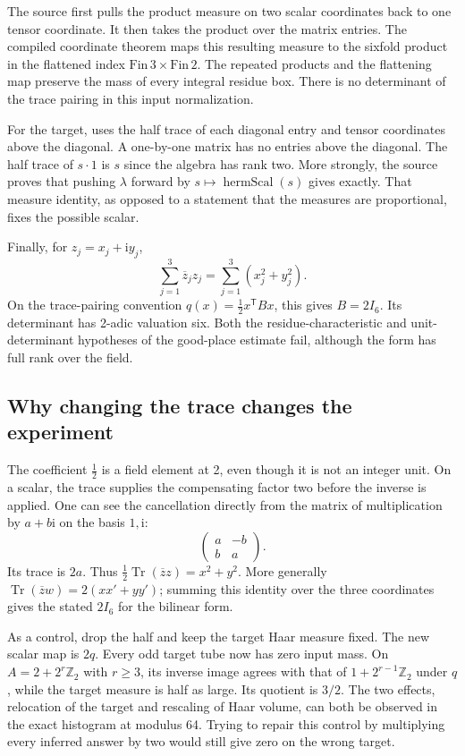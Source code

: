 \documentclass[12pt,letterpaper]{article}
\newcommand{\code}[1]{\texttt{\detokenize{#1}}}
\begin{document}
The source first pulls the product measure on two scalar coordinates back to one tensor coordinate. It then takes the product over the matrix entries. The compiled coordinate theorem maps this resulting measure to the sixfold product in the flattened index \( \mathrm{Fin}\,3\times\mathrm{Fin}\,2\). The repeated products and the flattening map preserve the mass of every integral residue box. There is no determinant of the trace pairing in this input normalization.

For the target, \code{coordHerm} uses the half trace of each diagonal entry and tensor coordinates above the diagonal. A one-by-one matrix has no entries above the diagonal. The half trace of \(s\cdot1\) is \(s\) since the algebra has rank two. More strongly, the source proves that pushing \(\lambda\) forward by \(s\mapsto\operatorname{hermScal}(s)\) gives \code{coordHerm} exactly. That measure identity, as opposed to a statement that the measures are proportional, fixes the possible scalar.

Finally, for \(z_j=x_j+\mathrm i y_j\),
\[
            \sum_{j=1}^3\overline z_j z_j
                    = \sum_{j=1}^3(x_j^2+y_j^2).
\]
On the trace-pairing convention \(q(x)=\tfrac12 x^\mathsf TBx\), this gives \(B=2I_6\). Its determinant has 2-adic valuation six. Both the residue-characteristic and unit-determinant hypotheses of the good-place estimate fail, although the form has full rank over the field.

\clearpage\subsection{Why changing the trace changes the experiment}
The coefficient \(\tfrac12\) is a field element at 2, even though it is not an integer unit. On a scalar, the trace supplies the compensating factor two before the inverse is applied. One can see the cancellation directly from the matrix of multiplication by \(a+b\mathrm i\) on the basis \(1,\mathrm i\):
\[
         \begin{pmatrix}a&-b\\b&a\end{pmatrix}.
\]
Its trace is \(2a\). Thus \(\tfrac12\operatorname{Tr}(\overline z z)=x^2+y^2\). More generally \(\operatorname{Tr}(\overline z w)=2(xx'+yy')\); summing this identity over the three coordinates gives the stated \(2I_6\) for the bilinear form.

As a control, drop the half and keep the target Haar measure fixed. The new scalar map is \(2q\). Every odd target tube now has zero input mass. On \(A=2+2^r\mathbb Z_2\) with \(r\ge3\), its inverse image agrees with that of \(1+2^{r-1}\mathbb Z_2\) under \(q\), while the target measure is half as large. Its quotient is \(3/2\). The two effects, relocation of the target and rescaling of Haar volume, can both be observed in the exact histogram at modulus 64. Trying to repair this control by multiplying every inferred answer by two would still give zero on the wrong target.
\end{document}

